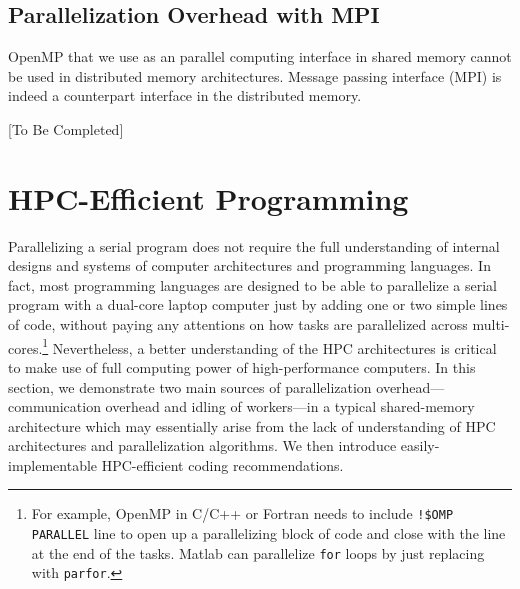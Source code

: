 \documentclass[12pt]{article}
\begin{document}
\subsection{Parallelization Overhead with MPI}
OpenMP that we use as an parallel computing interface in shared memory cannot be used in distributed memory architectures. Message passing interface (MPI) is indeed a counterpart interface in the distributed memory.

[To Be Completed]





\section{HPC-Efficient Programming}
Parallelizing a serial program does not require the full understanding of internal designs and systems of computer architectures and programming languages. In fact, most programming languages are designed to be able to parallelize a serial program with a dual-core laptop computer just by adding one or two simple lines of code, without paying any attentions on how tasks are parallelized across multi-cores.\footnote{\sf For example, OpenMP in C/C++ or Fortran needs to include \texttt{!\$OMP PARALLEL} line to open up a parallelizing block of code and close with the line at the end of the tasks. Matlab can parallelize \texttt{for} loops by just replacing with \texttt{parfor}.} Nevertheless, a better understanding of the HPC architectures is critical to make use of full computing power of high-performance computers. In this section, we demonstrate two main sources of parallelization overhead---communication overhead and idling of workers---in a typical shared-memory architecture which may essentially arise from the lack of understanding of HPC architectures and parallelization algorithms. We then introduce easily-implementable HPC-efficient coding recommendations.
\end{document}
